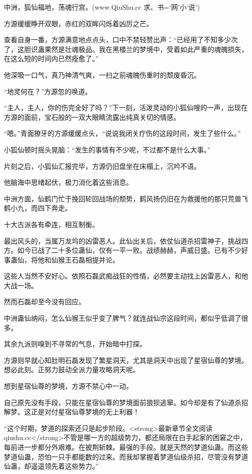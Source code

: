 
\begin{this_body}

中洲，狐仙福地，荡魂行宫。(www.QiuShu.cc 求、书=‘网’小‘说’)

方源缓缓睁开双眼，赤红的双眸闪烁着凶厉之芒。

查看自身一番，方源满意地点点头，口中不禁轻赞出声：“已经用了不知多少次了，这胆识蛊果然是壮魂极品。我在黑楼兰的梦境中，受着如此严重的魂魄损失，在这么短的时间内已然痊愈了。”

他深吸一口气，真乃神清气爽，一扫之前魂魄伤重时的颓废昏沉。

“地灵何在？”方源忽的唤道。

“主人，主人，你的伤完全好了吗？”下一刻，活泼灵动的小狐仙嗖的一声，出现在方源的面前，宝石般的一双大眼睛流露出纯真关切的情感。

“嗯。”青面獠牙的方源缓缓点头，“说说我闭关疗伤的这段时间，发生了些什么。”

小狐仙顿时摇头晃脑：“发生的事情有不少呢，不过都不是什么大事。”

片刻之后，小狐仙汇报完毕，方源仍旧盘坐在床榻上，沉吟不语。

他脑海中思绪起伏，极力消化着这些消息。

中洲方面，仙鹤门忙于挽回轮回战场的颓势，鹤风扬仍旧在为救援他的那只荒兽飞鹤小九，而四下奔走。

十大古派各有牵连，相互制衡。

最出风头的，当属万龙坞的凶雷恶人。此仙出关后，依仗仙道杀招雷神子，挑战四方。如今已战了二十多位蛊仙，仅有一平一败。战绩赫赫，声威日盛。已有不少好事蛊仙，将他和仙猴王石磊相提并论。

这些人当然不安好心。依照石磊武痴战狂的性情，必然要主动找上凶雷恶人，和他大战一场。

然而石磊却至今没有回应。

中洲蛊仙纳闷，怎么仙猴王似乎变了脾气？就连战仙宗这段时间，都似乎低调了很多。

其余九派则嗅到不寻常的气息，开始暗中打探。

方源则早就心知肚明石磊发现了繁星洞天，尤其是洞天中出现了星宿仙尊的梦境。想必此刻。正努力鼓动全派力量攻略洞天呢。

想到星宿仙尊的梦境，方源不禁心中一动。

自己原先没有手段，只能在星宿仙尊的梦境面前狼狈逃窜。如今却是有了仙道杀招解梦。这正是对付星宿仙尊梦境的无上利器！

“这个时期，梦道的探索还只是起步阶段。<strong>最新章节全文阅读qiushu.cc</strong>不管是哪一方的超级势力，都还局限在白手起家的困窘之中，每前进一步都分外艰难。在披荆斩棘。最强的手段。就是天然的梦道仙蛊。而这些梦道仙蛊，恐怕一只手都能数的过来。而我却掌握着梦道仙级杀招，尽管没有梦道仙蛊，却遥遥领先着这些势力。”


\end{this_body}
